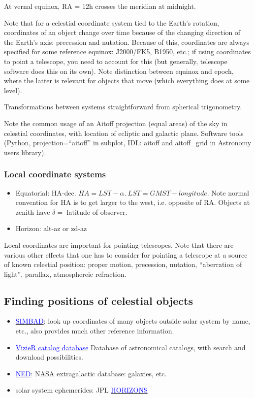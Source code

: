 \documentclass[12pt]{article}
\begin{document}
At vernal equinox, RA = 12h crosses the meridian at midnight.

Note that for a celestial coordinate system tied to the
Earth's rotation,
coordinates of an object change over time because of the changing direction
of the Earth's axis: precession and nutation. Because of this, coordinates are
always specified for some reference equinox: J2000/FK5, B1950, etc.; if using
coordinates to point a telescope, you need to account for this (but generally,
telescope software does this on its own). Note distinction between equinox and
epoch, where the latter is relevant for objects that move (which everything does
at some level).

Transformations between systems straightforward from spherical
trigonometry.

Note the common usage of an Aitoff projection (equal areas)
of the sky in celestial
coordinates, with location of ecliptic and galactic plane.
Software tools (Python, projection=``aitoff'' in subplot,
IDL: aitoff and aitoff\_grid in Astronomy users library).

\subsubsection*{Local coordinate systems}
\begin{itemize}
    \item Equatorial: HA-dec. $HA=LST - \alpha.\ LST=GMST - longitude$.
        Note normal convention for HA is to get larger to the west, i.e.
        opposite of RA. Objects at zenith have $\delta=$ latitude of observer.
    \item Horizon: alt-az or zd-az
\end{itemize}
Local coordinates are important for pointing telescopes. Note that there are
various other effects that one has to consider for pointing a telescope at a
source of known celestial position: proper motion, precession, nutation,
``aberration of light'', parallax, atmosphereic refraction.

\subsection*{Finding positions of celestial objects}
\begin{itemize}
    \item \href{http://simbad.u-strasbg.fr/simbad/}
        {\textcolor{blue}{SIMBAD}}:
        look up coordinates of many objects outside solar system
        by name, etc., also provides much other reference information.
    \item \href{http://vizier.u-strasbg.fr/viz-bin/VizieR}
        {\textcolor{blue}{VizieR catalog database}}
        Database of astronomical catalogs, with search and download
        possibilities.
    \item \href{http://ned.ipac.caltech.edu}
        {\textcolor{blue}{NED}}:
        NASA extragalactic database: galaxies, etc.
    \item solar system ephemerides: JPL
        \href{http://ssd.jpl.nasa.gov/horizons.cgi}
        {\textcolor{blue}{HORIZONS}}
\end{itemize}
\end{document}

